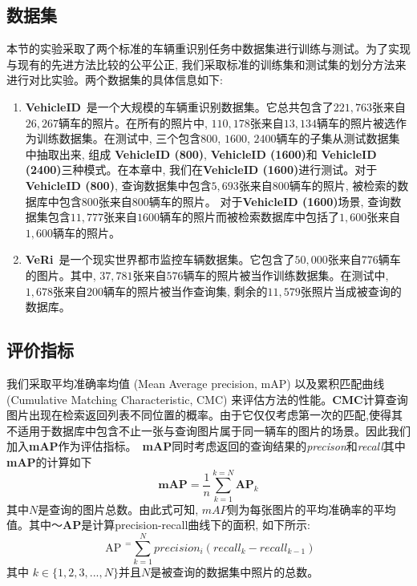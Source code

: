   \subsection{数据集}
  本节的实验采取了两个标准的车辆重识别任务中数据集进行训练与测试。为了实现与现有的先进方法比较的公平公正, 我们采取标准的训练集和测试集的划分方法来进行对比实验。两个数据集的具体信息如下:
  \begin{enumerate}
    \item \textbf{VehicleID}~\cite{liu2016deep}是一个大规模的车辆重识别数据集。它总共包含了$221,763$张来自$26,267$辆车的照片。在所有的照片中, $110,178$张来自$13,134$辆车的照片被选作为训练数据集。在测试中, 三个包含$800$, $1600$, $2400$辆车的子集从测试数据集中抽取出来, 组成 \textbf{VehicleID (800)}, \textbf{VehicleID (1600)}和 \textbf{VehicleID (2400)}三种模式。在本章中, 我们在\textbf{VehicleID (1600)}进行测试。对于\textbf{VehicleID (800)}, 查询数据集中包含$5,693$张来自$800$辆车的照片, 被检索的数据库中包含$800$张来自$800$辆车的照片。 对于\textbf{VehicleID (1600)}场景, 查询数据集包含$11,777$张来自$1600$辆车的照片而被检索数据库中包括了$1,600$张来自$1,600$辆车的照片。
    \item \textbf{VeRi}~\cite{liu2016deep}是一个现实世界都市监控车辆数据集。它包含了$50,000$张来自$776$辆车的图片。其中, $37,781$张来自$576$辆车的照片被当作训练数据集。在测试中, $1,678$张来自$200$辆车的照片被当作查询集, 剩余的$11,579$张照片当成被查询的数据库。
  \end{enumerate}
  \subsection{评价指标}
  我们采取平均准确率均值 (Mean Average precision, mAP) 以及累积匹配曲线 (Cumulative Matching Characteristic, CMC) 来评估方法的性能。\textbf{CMC}计算查询图片出现在检索返回列表不同位置的概率。由于它仅仅考虑第一次的匹配,使得其不适用于数据库中包含不止一张与查询图片属于同一辆车的图片的场景。因此我们加入\textbf{mAP}作为评估指标。~\textbf{mAP}同时考虑返回的查询结果的\textit{precison}和\textit{recall}其中 \textbf{mAP}的计算如下
  \begin{equation}
     \textbf{mAP} = \frac{1}{n} \sum_{k=1}^{k= N} \textbf{AP}_k
  \end{equation}
  其中$N$是查询的图片总数。由此式可知, $mAP$则为每张图片的平均准确率的平均值。其中～\textbf{AP}是计算precision-recall曲线下的面积, 如下所示:
  \begin{equation}
    \text { AP }^{=} \sum_{k=1}^{N} precision _{i}\left( recall _{k}- recall _{k-1}\right)
\end{equation}
其中 $k \in \{1, 2, 3, ..., N\}$并且$N$是被查询的数据集中照片的总数。

